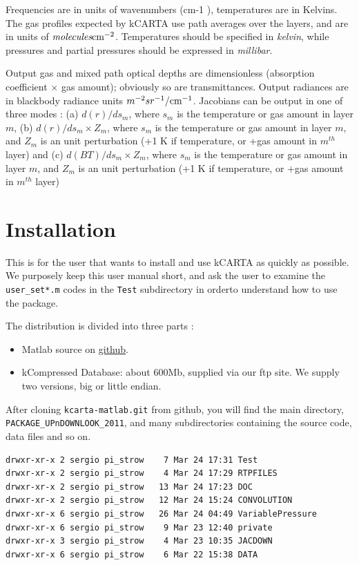 \documentclass[11pt]{article}
\newcommand{\kc}{kCARTA }
\newcommand{\wn}{cm-1 }
\newcommand{\cm}{\hbox{cm}}
\begin{document}
Frequencies are in units of wavenumbers (\wn), temperatures are in Kelvins. 
The gas profiles expected by \kc use path averages over the layers, and are 
in units of $\hbox{\em molecules} \cm^{-2}$.  Temperatures should be
specified in {\em kelvin}, while pressures and partial pressures
should be expressed in {\em millibar}. 

Output gas and mixed path optical depths are dimensionless (absorption
coefficient $\times$ gas amount); obviously so are transmittances.
Output radiances are in blackbody radiance units $m^{-2} sr^{-1}/\cm^{-1}$.  Jacobians can be output in one of three
modes : (a) $d(r)/ds_{m}$, where $s_{m}$ is the temperature or 
gas amount in layer $m$, (b) $d(r)/ds_{m} \times Z_{m}$, 
where $s_{m}$ is the temperature or gas amount in layer $m$, and $Z_{m}$ is 
an unit perturbation (+1 K if temperature, or +gas amount in $m^{th}$ layer) and
(c) $d(BT)/ds_{m} \times Z_{m}$, where $s_{m}$ is the temperature 
or gas amount in layer $m$, and $Z_{m}$ is an unit perturbation (+1 K if 
temperature, or +gas amount in $m^{th}$ layer)

\section{Installation}
This is for the user that wants to install and use \kc as quickly as
possible.  We purposely keep this user manual short, and ask the user
to examine the \texttt{user\_set*.m} codes in the \texttt{Test}
subdirectory in orderto understand how to use the package.

The distribution is divided into three parts :
\begin{itemize}
\item Matlab source on \href{http://github.com/strow/kcarta-matlab}{github}.

\item kCompressed Database: about 600Mb, supplied via our ftp site.
We supply two versions, big or little endian.
\end{itemize}

After cloning \texttt{kcarta-matlab.git} from github, you will find
the main directory, \texttt{PACKAGE\_UPnDOWNLOOK\_2011}, and many
subdirectories containing the source code, data files and so on.

\begin{small}
\begin{verbatim}
drwxr-xr-x 2 sergio pi_strow    7 Mar 24 17:31 Test
drwxr-xr-x 2 sergio pi_strow    4 Mar 24 17:29 RTPFILES
drwxr-xr-x 2 sergio pi_strow   13 Mar 24 17:23 DOC
drwxr-xr-x 2 sergio pi_strow   12 Mar 24 15:24 CONVOLUTION
drwxr-xr-x 6 sergio pi_strow   26 Mar 24 04:49 VariablePressure
drwxr-xr-x 6 sergio pi_strow    9 Mar 23 12:40 private
drwxr-xr-x 3 sergio pi_strow    4 Mar 23 10:35 JACDOWN
drwxr-xr-x 6 sergio pi_strow    6 Mar 22 15:38 DATA
\end{verbatim}
\end{small}
\end{document}
